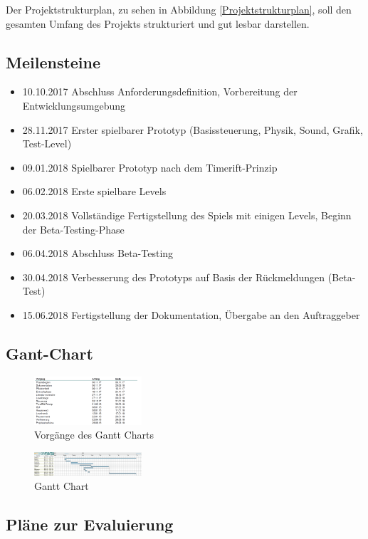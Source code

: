 Der Projektstrukturplan, zu sehen in Abbildung \ref{Projektstrukturplan}, soll den gesamten Umfang des Projekts strukturiert und gut lesbar darstellen.

\subsection{Meilensteine}\begin{itemize}
	\item 10.10.2017 Abschluss Anforderungsdefinition, Vorbereitung der Entwicklungsumgebung	
	\item 28.11.2017 Erster spielbarer Prototyp (Basissteuerung, Physik, Sound, Grafik, Test-Level)	
	\item 09.01.2018 Spielbarer Prototyp nach dem Timerift-Prinzip	
	\item 06.02.2018 Erste spielbare Levels	
	\item 20.03.2018 Vollständige Fertigstellung des Spiels mit einigen Levels, Beginn der Beta-Testing-Phase	
	\item 06.04.2018 Abschluss Beta-Testing	
	\item 30.04.2018 Verbesserung des Prototyps auf Basis der Rückmeldungen (Beta-Test)
	\item 15.06.2018 Fertigstellung der Dokumentation, Übergabe an den Auftraggeber
\end{itemize}
\subsection{Gant-Chart}
\begin{figure}[H]
	\centering
	\includegraphics[width=4cm]{images/Vorgaenge.png}
	\caption{Vorgänge des Gantt Charts}		
\end{figure}
\begin{figure}[H]
	\centering
	\includegraphics[width=4cm]{images/Gantt.png}
	\caption{Gantt Chart}		
\end{figure}

\subsection{Pläne zur Evaluierung}
